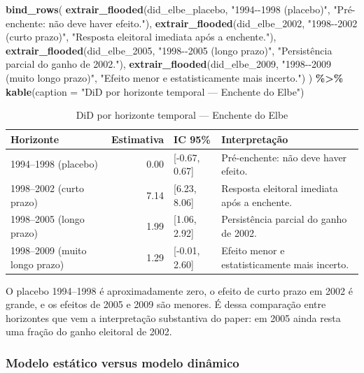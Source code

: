 \documentclass[
]{article}
\newenvironment{Shaded}{\begin{snugshade}}{\end{snugshade}}
\newcommand{\AttributeTok}[1]{\textcolor[rgb]{0.13,0.29,0.53}{#1}}
\newcommand{\FunctionTok}[1]{\textcolor[rgb]{0.13,0.29,0.53}{\textbf{#1}}}
\newcommand{\NormalTok}[1]{#1}
\newcommand{\SpecialCharTok}[1]{\textcolor[rgb]{0.81,0.36,0.00}{\textbf{#1}}}
\newcommand{\StringTok}[1]{\textcolor[rgb]{0.31,0.60,0.02}{#1}}
\begin{document}
\begin{Shaded}
\begin{Highlighting}[]
\FunctionTok{bind\_rows}\NormalTok{(}
  \FunctionTok{extrair\_flooded}\NormalTok{(did\_elbe\_placebo, }\StringTok{"1994{-}{-}1998 (placebo)"}\NormalTok{, }\StringTok{"Pré{-}enchente: não deve haver efeito."}\NormalTok{),}
  \FunctionTok{extrair\_flooded}\NormalTok{(did\_elbe\_2002, }\StringTok{"1998{-}{-}2002 (curto prazo)"}\NormalTok{, }\StringTok{"Resposta eleitoral imediata após a enchente."}\NormalTok{),}
  \FunctionTok{extrair\_flooded}\NormalTok{(did\_elbe\_2005, }\StringTok{"1998{-}{-}2005 (longo prazo)"}\NormalTok{, }\StringTok{"Persistência parcial do ganho de 2002."}\NormalTok{),}
  \FunctionTok{extrair\_flooded}\NormalTok{(did\_elbe\_2009, }\StringTok{"1998{-}{-}2009 (muito longo prazo)"}\NormalTok{, }\StringTok{"Efeito menor e estatisticamente mais incerto."}\NormalTok{)}
\NormalTok{) }\SpecialCharTok{\%\textgreater{}\%}
  \FunctionTok{kable}\NormalTok{(}\AttributeTok{caption =} \StringTok{"DiD por horizonte temporal — Enchente do Elbe"}\NormalTok{)}
\end{Highlighting}
\end{Shaded}

\begin{table}

\caption{\label{tab:elbe-paper-models}DiD por horizonte temporal — Enchente do Elbe}
\centering
\begin{tabular}[t]{l|r|l|l}
\hline
Horizonte & Estimativa & IC 95\% & Interpretação\\
\hline
1994--1998 (placebo) & 0.00 & [-0.67, 0.67] & Pré-enchente: não deve haver efeito.\\
\hline
1998--2002 (curto prazo) & 7.14 & [6.23, 8.06] & Resposta eleitoral imediata após a enchente.\\
\hline
1998--2005 (longo prazo) & 1.99 & [1.06, 2.92] & Persistência parcial do ganho de 2002.\\
\hline
1998--2009 (muito longo prazo) & 1.29 & [-0.01, 2.60] & Efeito menor e estatisticamente mais incerto.\\
\hline
\end{tabular}
\end{table}

O placebo 1994--1998 é aproximadamente zero, o efeito de curto prazo em 2002 é grande, e os efeitos de 2005 e 2009 são menores. É dessa comparação entre horizontes que vem a interpretação substantiva do paper: em 2005 ainda resta uma fração do ganho eleitoral de 2002.

\subsubsection{Modelo estático versus modelo dinâmico}\label{modelo-estuxe1tico-versus-modelo-dinuxe2mico}
\end{document}

